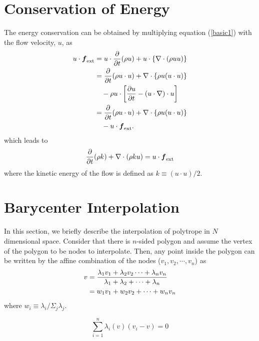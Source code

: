 \documentclass[twocolumn]{aastex63}
\newcommand{\vel}{{u}}
\begin{document}
\section{Conservation of Energy}
The energy conservation can be obtained by multiplying equation (\ref{basic1}) with the flow velocity, $\vel$, as 
\begin{equation}
\begin{aligned}
 \vel\cdot\boldsymbol{f}_\text{ext}
 &=\vel\cdot{\partial \over \partial t}(\rho\vel)
   +\vel\cdot\left\{\nabla\cdot(\rho\vel\vel)\right\}\\
 &={\partial\over \partial t}(\rho \vel\cdot\vel)
   +\nabla\cdot\left\{\rho \vel (\vel\cdot\vel)\right\}\\
 &\quad-\rho\vel\cdot\left[
   {\partial\vel\over\partial t}-(\vel\cdot\nabla)\cdot\vel\right]\\
 &={\partial\over \partial t}(\rho \vel\cdot\vel)
   +\nabla\cdot\left\{\rho \vel (\vel\cdot\vel)\right\}\\
 &\quad-\vel\cdot\boldsymbol{f}_\text{ext}.
\end{aligned}
\end{equation}
which leads to
\begin{equation}
	{\partial \over \partial t}(\rho k) + \nabla\cdot(\rho k \vel) = \vel\cdot\boldsymbol{f}_\text{ext}
\end{equation}
where the kinetic energy of the flow is defined as $k \equiv (\vel\cdot\vel)/2$.


\section{Barycenter Interpolation} \label{baryinter}
In this section, we briefly describe the interpolation of polytrope in $N$ dimensional space.
Consider that there is $n$-sided polygon and assume the vertex of the polygon to be nodes to interpolate. Then, any point inside the polygon can be written by the affine combination of the nodes ($v_1, v_2, \cdots, v_n$) as
\begin{equation}
\begin{aligned}
  v &= {\lambda_1 v_1 + \lambda_2 v_2\cdots +\lambda_n v_n
        \over \lambda_1 + \lambda_2 +\cdots + \lambda_n}\\
    &= w_1v_1+w_2v_2+\cdots +w_nv_n
\end{aligned}
\end{equation} 
where $w_i \equiv \lambda_i/\Sigma_j \lambda_j$.

\begin{equation}
	\sum_{i=1}^n \lambda_i(v) (v_i-v) = 0
\end{equation}
\end{document}
